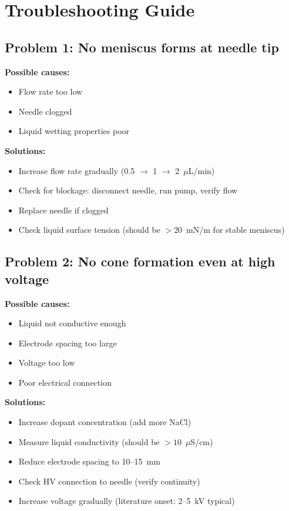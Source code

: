 \documentclass[11pt]{article}
\begin{document}
\section{Troubleshooting Guide}

\subsection{Problem 1: No meniscus forms at needle tip}

\textbf{Possible causes:}
\begin{itemize}
\item Flow rate too low
\item Needle clogged
\item Liquid wetting properties poor
\end{itemize}

\textbf{Solutions:}
\begin{itemize}
\item Increase flow rate gradually (0.5 $\rightarrow$ 1 $\rightarrow$ 2~$\mu$L/min)
\item Check for blockage: disconnect needle, run pump, verify flow
\item Replace needle if clogged
\item Check liquid surface tension (should be $>20$~mN/m for stable meniscus)
\end{itemize}

\subsection{Problem 2: No cone formation even at high voltage}

\textbf{Possible causes:}
\begin{itemize}
\item Liquid not conductive enough
\item Electrode spacing too large
\item Voltage too low
\item Poor electrical connection
\end{itemize}

\textbf{Solutions:}
\begin{itemize}
\item Increase dopant concentration (add more NaCl)
\item Measure liquid conductivity (should be $>10$~$\mu$S/cm)
\item Reduce electrode spacing to 10--15~mm
\item Check HV connection to needle (verify continuity)
\item Increase voltage gradually (literature onset: 2--5~kV typical)
\end{itemize}
\end{document}

